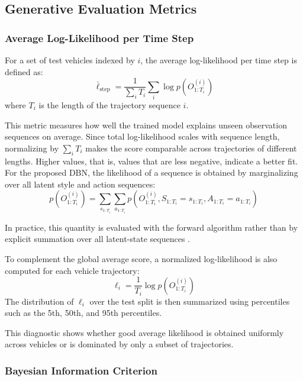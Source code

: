 \subsection{Generative Evaluation Metrics}
\label{subsec:generative_evaluation_metrics}
\subsubsection{Average Log-Likelihood per Time Step}

For a set of test vehicles indexed by $i$, the average log-likelihood per time step is defined as:
\begin{equation}
\bar{\ell}_{\mathrm{step}}
=
\frac{1}{\sum_i T_i}
\sum_i \log p\!\left(O^{(i)}_{1:T_i}\right)
\end{equation}
where $T_i$ is the length of the trajectory sequence $i$.

This metric measures how well the trained model explains unseen observation
sequences on average. Since total log-likelihood scales with sequence length,
normalizing by $\sum_i T_i$ makes the score comparable across trajectories of different lengths. Higher values, that is, values
that are less negative, indicate a better fit.
For the proposed \ac{DBN}, the likelihood of a sequence is obtained by
marginalizing over all latent style and action sequences:
\begin{equation}
p\!\left(O^{(i)}_{1:T_i}\right)
=
\sum_{s_{1:T_i}} \sum_{a_{1:T_i}}
p\!\left(O^{(i)}_{1:T_i}, S_{1:T_i}=s_{1:T_i}, A_{1:T_i}=a_{1:T_i}\right)
\end{equation}

In practice, this quantity is evaluated with the forward algorithm rather than
by explicit summation over all latent-state sequences \cite{rabiner1989tutorial,pml1Book}.

\par To complement the global average score, a normalized log-likelihood is also
computed for each vehicle trajectory:
\begin{equation}
\ell_i
=
\frac{1}{T_i}
\log p\!\left(O^{(i)}_{1:T_i}\right)
\end{equation}
The distribution of $\ell_i$ over the test split is then summarized using
percentiles such as the 5th, 50th, and 95th percentiles.

This diagnostic shows whether good average likelihood is obtained uniformly
across vehicles or is dominated by only a subset of trajectories.

\subsubsection{Bayesian Information Criterion}

